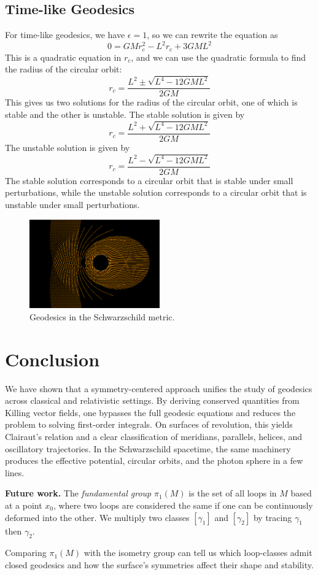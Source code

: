\documentclass[12pt]{article}
\begin{document}
\subsection{Time-like Geodesics}
For time-like geodesics, we have \(\epsilon = 1\), so we can rewrite the equation as
\[
	0 = GM r_{c}^{2} - L^{2} r_{c} + 3GM L^{2}
\]
This is a quadratic equation in \(r_{c}\), and we can use the quadratic formula to find the radius of the circular orbit:
\[
	r_{c} = \frac{L^{2} \pm \sqrt{L^{4} - 12GM L^{2}}}{2GM}
\]
This gives us two solutions for the radius of the circular orbit, one of which is stable and the other is unstable.
The stable solution is given by
\[
	r_{c} = \frac{L^{2} + \sqrt{L^{4} - 12GM L^{2}}}{2GM}
\]
The unstable solution is given by
\[
	r_{c} = \frac{L^{2} - \sqrt{L^{4} - 12GM L^{2}}}{2GM}
\]
The stable solution corresponds to a circular orbit that is stable under small perturbations, while the unstable solution corresponds to a circular orbit that is unstable under small perturbations.

\begin{figure}
	\centering
	\includegraphics[width=0.5\textwidth]{images/bh_geo.png}
	\caption{Geodesics in the Schwarzschild metric.}
	\label{fig:bh_geo}
\end{figure}

\section{Conclusion}

We have shown that a symmetry-centered approach unifies the study of geodesics across classical and relativistic settings.  
By deriving conserved quantities from Killing vector fields, one bypasses the full geodesic equations and reduces the problem to solving first-order integrals.  
On surfaces of revolution, this yields Clairaut’s relation and a clear classification of meridians, parallels, helices, and oscillatory trajectories. 
In the Schwarzschild spacetime, the same machinery produces the effective potential, circular orbits, and the photon sphere in a few lines.

\medskip\noindent\textbf{Future work.}  
The \emph{fundamental group} \(\pi_{1}(M)\) is the set of all loops in \(M\) based at a point \(x_{0}\), where two loops are considered the same if one can be continuously deformed into the other.  
We multiply two classes \([\gamma_{1}]\) and \([\gamma_{2}]\) by tracing \(\gamma_{1}\) then \(\gamma_{2}\).  

Comparing \(\pi_{1}(M)\) with the isometry group can tell us which loop-classes admit closed geodesics and how the surface’s symmetries affect their shape and stability.

\nocite{*}


\end{document}
